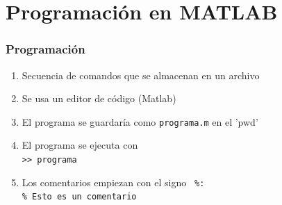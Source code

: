 \section{Programación en MATLAB}
\begin{frame}[label=programacion]
\frametitle{Programación}
 \begin{enumerate}
  \item Secuencia de comandos que se almacenan en un archivo
  \item Se usa un editor de código (Matlab)
  \item El programa se guardaría como \alert{\texttt{programa.m}} en el 'pwd'
  \item El programa se ejecuta con \\\texttt{>> programa}
  \item Los comentarios empiezan con el signo \texttt{
      \%:\\\textcolor{Comentario}{\% Esto es un comentario}}
 \end{enumerate}
\end{frame}
